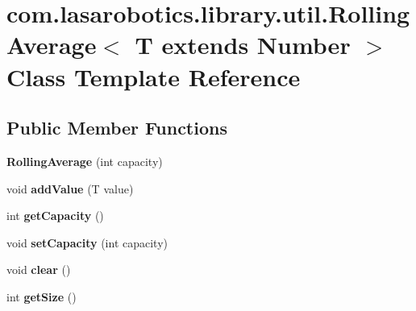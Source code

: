 \hypertarget{classcom_1_1lasarobotics_1_1library_1_1util_1_1_rolling_average}{}\section{com.\+lasarobotics.\+library.\+util.\+Rolling\+Average$<$ T extends Number $>$ Class Template Reference}
\label{classcom_1_1lasarobotics_1_1library_1_1util_1_1_rolling_average}
\subsection*{Public Member Functions}
\begin{DoxyCompactItemize}
\item 
\hypertarget{classcom_1_1lasarobotics_1_1library_1_1util_1_1_rolling_average_ae431f75889ba3375b3a852be00e5b007}{}{\bfseries Rolling\+Average} (int capacity)\label{classcom_1_1lasarobotics_1_1library_1_1util_1_1_rolling_average_ae431f75889ba3375b3a852be00e5b007}

\item 
\hypertarget{classcom_1_1lasarobotics_1_1library_1_1util_1_1_rolling_average_a3cae7fa9489d73c1c1f981ad4008ea22}{}void {\bfseries add\+Value} (T value)\label{classcom_1_1lasarobotics_1_1library_1_1util_1_1_rolling_average_a3cae7fa9489d73c1c1f981ad4008ea22}

\item 
\hypertarget{classcom_1_1lasarobotics_1_1library_1_1util_1_1_rolling_average_af8ddaee994f8a4ef950d3ae346d577db}{}int {\bfseries get\+Capacity} ()\label{classcom_1_1lasarobotics_1_1library_1_1util_1_1_rolling_average_af8ddaee994f8a4ef950d3ae346d577db}

\item 
\hypertarget{classcom_1_1lasarobotics_1_1library_1_1util_1_1_rolling_average_afa65f13150c305f83f5b66b34ba073a4}{}void {\bfseries set\+Capacity} (int capacity)\label{classcom_1_1lasarobotics_1_1library_1_1util_1_1_rolling_average_afa65f13150c305f83f5b66b34ba073a4}

\item 
\hypertarget{classcom_1_1lasarobotics_1_1library_1_1util_1_1_rolling_average_abe3e09c5a64f209c350b0ee755208ac1}{}void {\bfseries clear} ()\label{classcom_1_1lasarobotics_1_1library_1_1util_1_1_rolling_average_abe3e09c5a64f209c350b0ee755208ac1}

\item 
\hypertarget{classcom_1_1lasarobotics_1_1library_1_1util_1_1_rolling_average_a20361639d89c2447bd3eeee92035a9b3}{}int {\bfseries get\+Size} ()\label{classcom_1_1lasarobotics_1_1library_1_1util_1_1_rolling_average_a20361639d89c2447bd3eeee92035a9b3}


\end{DoxyCompactItemize}

